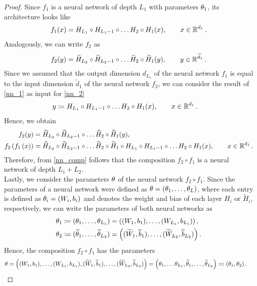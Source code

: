 \begin{proof}
Since $f_1$ is a neural network of depth $L_1$ with parameters $\theta_1$, its architecture looks like
\begin{align}\label{nn_1}
f_1 (x) = H_{L_1} \circ H_{L_1-1} \circ \ldots H_{2} \circ H_1 (x),\qquad x \in \operatorname{\mathbb{R}}^{d_1}.
\end{align}
Analogously, we can write $f_2$ as
\begin{align}\label{nn_2}
f_2 (y) = \widetilde{H}_{L_2} \circ \widetilde{H}_{L_2-1} \circ \ldots \widetilde{H}_{2} \circ \widetilde{H}_1 (y), \qquad y \in \operatorname{\mathbb{R}}^{\widetilde{d}_1}.
\end{align}
Since we assumed that the output dimension $d_{L_1}$ of the neural network $f_1$ is equal to the input dimension $\tilde{d}_1$ of the neural network $f_2$, we can consider the result of \eqref{nn_1} as input for \eqref{nn_2}
\begin{align*}
y &\coloneqq H_{L_1} \circ H_{L_1-1} \circ \ldots H_{2} \circ H_1 (x), \qquad x \in \operatorname{\mathbb{R}}^{d_1}.
\end{align*}
Hence, we obtain
\begin{align}\label{nn_comp}
f_2 (y) &= \widetilde{H}_{L_2} \circ \widetilde{H}_{L_2-1} \circ \ldots \widetilde{H}_{2} \circ \widetilde{H}_1 (y),\nonumber\\
f_2\left(f_1\left(x\right)\right)  &= \widetilde{H}_{L_2} \circ \widetilde{H}_{L_2-1} \circ \ldots \widetilde{H}_{2} \circ \widetilde{H}_1 \circ H_{L_1} \circ H_{L_1-1} \circ \ldots H_{2} \circ H_1 (x), \qquad x \in \operatorname{\mathbb{R}}^{d_1}.
\end{align}
Therefore, from \eqref{nn_comp} follows that the composition $f_2 \circ f_1$ is a neural network of depth $L_1 + L_2$.\\
Lastly, we consider the parameters $\theta$ of the neural network $f_2 \circ f_1$. Since the parameters of a neural network were defined as $\theta = (\theta_1,\ldots, \theta_L)$, where each entry is defined as $\theta_i = (W_i, b_i)$ and denotes the weight and bias of each layer $H_i$ or $\tilde{H}_i$, respectively, we can write the parameters of both neural networks as
\begin{align*}
\theta_1 &\coloneqq (\theta_1, \ldots, \theta_{L_1}) = \left((W_1, b_1),\ldots, (W_{L_1}, b_{L_1}) \right),\\
\theta_2 &\coloneqq (\widetilde{\theta}_1, \ldots, \widetilde{\theta}_{L_2}) = \left((\widetilde{W}_1, \widetilde{b}_1),\ldots, (\widetilde{W}_{L_2}, \widetilde{b}_{L_2}) \right).
\end{align*}
Hence, the composition $f_2\circ f_1$ has the parameters
\begin{align*}
\theta  &= \left((W_1, b_1),\ldots, (W_{L_1}, b_{L_1}), (\widetilde{W}_1, \widetilde{b}_1),\ldots, (\widetilde{W}_{L_2}, \widetilde{b}_{L_2})  \right) = \left(\theta_1,\ldots \theta_{L_1}, \widetilde{\theta}_1, \ldots, \widetilde{\theta}_{L_2} \right) \eqqcolon \left(\theta_1,\theta_2 \right).
\end{align*}
\end{proof}


